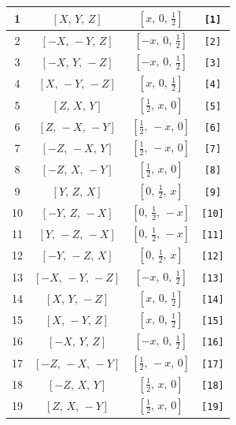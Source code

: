\documentclass[fleqn,8pt]{jsarticle}
\begin{document}
\begin{longtable}{cccc}
1 & $\left[ X,\, Y,\, Z \right]$ & $\left[ x,\, 0,\, \frac{1}{2} \right]$ & {\tt [1]} \\ \hline
2 & $\left[ - X,\, - Y,\, Z \right]$ & $\left[ - x,\, 0,\, \frac{1}{2} \right]$ & {\tt [2]} \\ \hline
3 & $\left[ - X,\, Y,\, - Z \right]$ & $\left[ - x,\, 0,\, \frac{1}{2} \right]$ & {\tt [3]} \\ \hline
4 & $\left[ X,\, - Y,\, - Z \right]$ & $\left[ x,\, 0,\, \frac{1}{2} \right]$ & {\tt [4]} \\ \hline
5 & $\left[ Z,\, X,\, Y \right]$ & $\left[ \frac{1}{2},\, x,\, 0 \right]$ & {\tt [5]} \\ \hline
6 & $\left[ Z,\, - X,\, - Y \right]$ & $\left[ \frac{1}{2},\, - x,\, 0 \right]$ & {\tt [6]} \\ \hline
7 & $\left[ - Z,\, - X,\, Y \right]$ & $\left[ \frac{1}{2},\, - x,\, 0 \right]$ & {\tt [7]} \\ \hline
8 & $\left[ - Z,\, X,\, - Y \right]$ & $\left[ \frac{1}{2},\, x,\, 0 \right]$ & {\tt [8]} \\ \hline
9 & $\left[ Y,\, Z,\, X \right]$ & $\left[ 0,\, \frac{1}{2},\, x \right]$ & {\tt [9]} \\ \hline
10 & $\left[ - Y,\, Z,\, - X \right]$ & $\left[ 0,\, \frac{1}{2},\, - x \right]$ & {\tt [10]} \\ \hline
11 & $\left[ Y,\, - Z,\, - X \right]$ & $\left[ 0,\, \frac{1}{2},\, - x \right]$ & {\tt [11]} \\ \hline
12 & $\left[ - Y,\, - Z,\, X \right]$ & $\left[ 0,\, \frac{1}{2},\, x \right]$ & {\tt [12]} \\ \hline
13 & $\left[ - X,\, - Y,\, - Z \right]$ & $\left[ - x,\, 0,\, \frac{1}{2} \right]$ & {\tt [13]} \\ \hline
14 & $\left[ X,\, Y,\, - Z \right]$ & $\left[ x,\, 0,\, \frac{1}{2} \right]$ & {\tt [14]} \\ \hline
15 & $\left[ X,\, - Y,\, Z \right]$ & $\left[ x,\, 0,\, \frac{1}{2} \right]$ & {\tt [15]} \\ \hline
16 & $\left[ - X,\, Y,\, Z \right]$ & $\left[ - x,\, 0,\, \frac{1}{2} \right]$ & {\tt [16]} \\ \hline
17 & $\left[ - Z,\, - X,\, - Y \right]$ & $\left[ \frac{1}{2},\, - x,\, 0 \right]$ & {\tt [17]} \\ \hline
18 & $\left[ - Z,\, X,\, Y \right]$ & $\left[ \frac{1}{2},\, x,\, 0 \right]$ & {\tt [18]} \\ \hline
19 & $\left[ Z,\, X,\, - Y \right]$ & $\left[ \frac{1}{2},\, x,\, 0 \right]$ & {\tt [19]} \\ \hline

\end{longtable}
\end{document}
